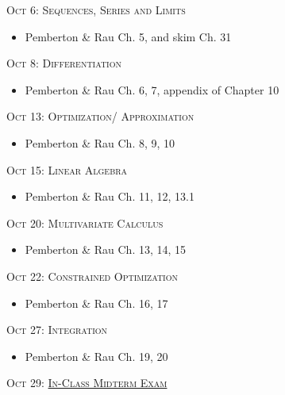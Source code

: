 \documentclass[11pt]{article}
\begin{document}
\noindent \textsc{Oct 6: Sequences, Series and Limits}

\begin{itemize}
\item Pemberton \& Rau Ch. 5, and skim Ch. 31
\end{itemize}



\noindent \textsc{Oct 8:  Differentiation}

\begin{itemize}
\item Pemberton \& Rau Ch. 6, 7, appendix of Chapter 10

\end{itemize}



\noindent \textsc{Oct 13: Optimization/ Approximation}

\begin{itemize}
\item Pemberton \& Rau Ch. 8, 9, 10

\end{itemize}


\noindent \textsc{Oct 15: Linear Algebra}

\begin{itemize}

\item Pemberton \& Rau Ch. 11, 12, 13.1


\end{itemize}


\noindent \textsc{Oct 20:  Multivariate Calculus}

\begin{itemize}

\item Pemberton \& Rau Ch. 13, 14, 15

\end{itemize}


\noindent \textsc{Oct 22: Constrained Optimization }

\begin{itemize}
\item Pemberton \& Rau Ch. 16, 17
\end{itemize}



\noindent \textsc{Oct 27:  Integration }
\begin{itemize}
\item Pemberton \& Rau Ch. 19, 20
\end{itemize}
\newpage


\noindent \textsc{Oct 29:  \underline{In-Class Midterm Exam}}
\end{document}
